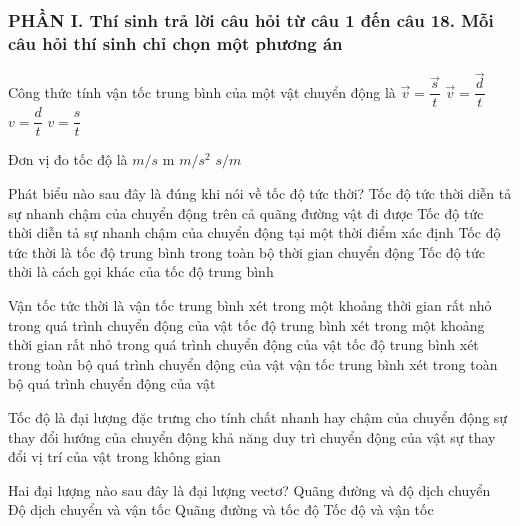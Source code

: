 \newpage 


\subsubsection*{PHẦN I. Thí sinh trả lời câu hỏi từ câu 1 đến câu 18. Mỗi câu hỏi thí sinh chỉ chọn một phương án}
\setcounter{ex}{0}
\begin{ex}%
Công thức tính vận tốc trung bình của một vật chuyển động là
\choice
{$\vec{v}=\dfrac{\vec{s}}{t}$}
{\True $\vec{v}=\dfrac{\vec{d}}{t}$}
{$v=\dfrac{d}{t}$}
{$v=\dfrac{s}{t}$}

\loigiai{

}
 \end{ex}
\begin{ex}%
Đơn vị đo tốc độ là
\choice
{\True $m/s$}
{m}
{$m/s^2$}
{$s / m$}

\loigiai{

}
 \end{ex}
\begin{ex}%
Phát biểu nào sau đây là đúng khi nói về tốc độ tức thời?
\choice
{Tốc độ tức thời diễn tả sự nhanh chậm của chuyển động trên cả quãng đường vật đi được}
{\True Tốc độ tức thời diễn tả sự nhanh chậm của chuyển động tại một thời điểm xác định}
{Tốc độ tức thời là tốc độ trung bình trong toàn bộ thời gian chuyển động}
{Tốc độ tức thời là cách gọi khác của tốc độ trung bình}

\loigiai{
}
 \end{ex}
\begin{ex}%
Vận tốc tức thời là
\choice
{\True vận tốc trung bình xét trong một khoảng thời gian rất nhỏ trong quá trình chuyển động của vật}
{tốc độ trung bình xét trong một khoảng thời gian rất nhỏ trong quá trình chuyển động của vật}
{tốc độ trung bình xét trong toàn bộ quá trình chuyển động của vật}
{vận tốc trung bình xét trong toàn bộ quá trình chuyển động của vật}
\loigiai{
}
\end{ex}
\begin{ex}%
Tốc độ là đại lượng đặc trưng cho
\choice
{\True tính chất nhanh hay chậm của chuyển động}
{sự thay đổi hướng của chuyển động}
{khả năng duy trì chuyển động của vật}
{sự thay đổi vị trí của vật trong không gian}
\loigiai{
}
 \end{ex}
\begin{ex}%
Hai đại lượng nào sau đây là đại lượng vectơ?
\choice
{Quãng đường và độ dịch chuyển}
{\True Độ dịch chuyển và vận tốc}
{Quãng đường và tốc độ}
{Tốc độ và vận tốc}

\loigiai{
}
 \end{ex}
